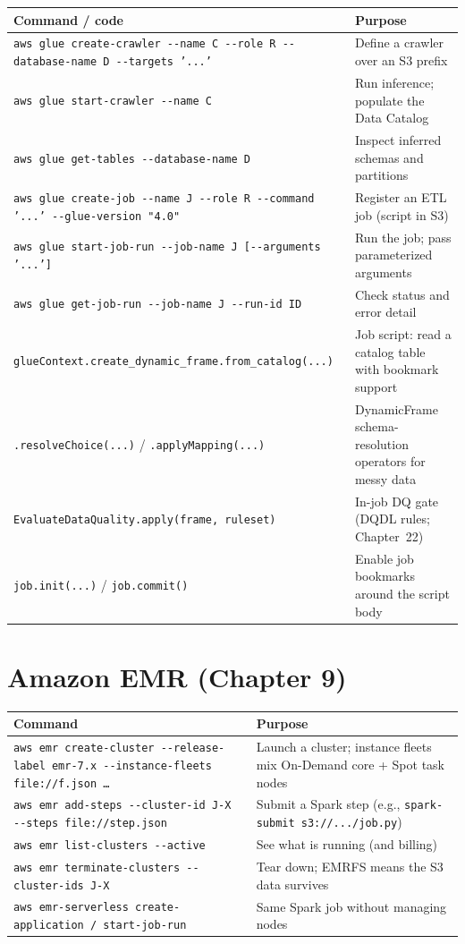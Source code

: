 \begin{center}
\footnotesize
\begin{tabular}{@{}p{7.2cm}p{7.6cm}@{}}
\toprule
\textbf{Command / code} & \textbf{Purpose} \\
\midrule
\texttt{aws glue create-crawler -{}-name C -{}-role R -{}-database-name D -{}-targets '{...}'} & Define a crawler over an S3 prefix \\
\texttt{aws glue start-crawler -{}-name C} & Run inference; populate the Data Catalog \\
\texttt{aws glue get-tables -{}-database-name D} & Inspect inferred schemas and partitions \\
\texttt{aws glue create-job -{}-name J -{}-role R -{}-command '{...}' -{}-glue-version "4.0"} & Register an ETL job (script in S3) \\
\texttt{aws glue start-job-run -{}-job-name J [-{}-arguments '{...}']} & Run the job; pass parameterized arguments \\
\texttt{aws glue get-job-run -{}-job-name J -{}-run-id ID} & Check status and error detail \\
\texttt{glueContext.create\_dynamic\_frame.from\_catalog(...)} & Job script: read a catalog table with bookmark support \\
\texttt{.resolveChoice(...)} / \texttt{.applyMapping(...)} & DynamicFrame schema-resolution operators for messy data \\
\texttt{EvaluateDataQuality.apply(frame, ruleset)} & In-job DQ gate (DQDL rules; Chapter~22) \\
\texttt{job.init(...)} / \texttt{job.commit()} & Enable job bookmarks around the script body \\
\bottomrule
\end{tabular}
\end{center}

\section{Amazon EMR (Chapter 9)}
%

\begin{center}
\footnotesize
\begin{tabular}{@{}p{7.2cm}p{7.6cm}@{}}
\toprule
\textbf{Command} & \textbf{Purpose} \\
\midrule
\texttt{aws emr create-cluster -{}-release-label emr-7.x -{}-instance-fleets file://f.json \dots} & Launch a cluster; instance fleets mix On-Demand core + Spot task nodes \\
\texttt{aws emr add-steps -{}-cluster-id J-X -{}-steps file://step.json} & Submit a Spark step (e.g., \texttt{spark-submit s3://.../job.py}) \\
\texttt{aws emr list-clusters -{}-active} & See what is running (and billing) \\
\texttt{aws emr terminate-clusters -{}-cluster-ids J-X} & Tear down; EMRFS means the S3 data survives \\
\texttt{aws emr-serverless create-application / start-job-run} & Same Spark job without managing nodes \\
\bottomrule
\end{tabular}
\end{center}

